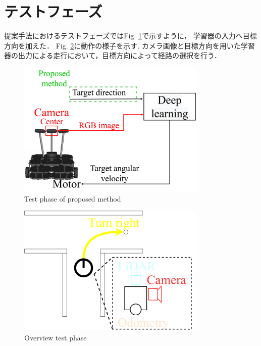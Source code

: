 \section{テストフェーズ}
\label{test}
提案手法におけるテストフェーズではFig. \ref{fig::testsystem}で示すように，
学習器の入力へ目標方向を加えた．
Fig. \ref{fig::test_abs}に動作の様子を示す.
カメラ画像と目標方向を用いた学習器の出力による走行において，目標方向によって経路の選択を行う．

\begin{figure}[h]
    \centering
    \includegraphics[width = 9cm]{./figs/system_test.pdf}
    \caption{Test phase of proposed method}
    \label{fig::testsystem}
\end{figure}
\begin{figure}[h]
  \centering
  \includegraphics[width = 9cm]{./figs/test_abs.pdf}
  \caption{Overview test phase}
  \label{fig::test_abs}
\end{figure}

